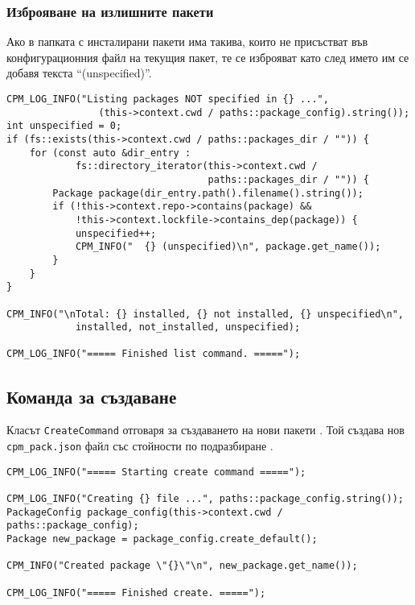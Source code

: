 \subsubsection{Изброяване на излишните пакети}

Ако в папката с инсталирани пакети има такива, които не присъстват във
конфигурационния файл на текущия пакет, те се изброяват като след името им се
добавя текста ``(unspecified)''.

\begin{lstlisting}[style=cpp,
				   caption=Команда за изброяване,
				   label={lst:list-unspecified}]
CPM_LOG_INFO("Listing packages NOT specified in {} ...",
				(this->context.cwd / paths::package_config).string());
int unspecified = 0;
if (fs::exists(this->context.cwd / paths::packages_dir / "")) {
	for (const auto &dir_entry :
			fs::directory_iterator(this->context.cwd /
								   paths::packages_dir / "")) {
		Package package(dir_entry.path().filename().string());
		if (!this->context.repo->contains(package) &&
			!this->context.lockfile->contains_dep(package)) {
			unspecified++;
			CPM_INFO("  {} (unspecified)\n", package.get_name());
		}
	}
}

CPM_INFO("\nTotal: {} installed, {} not installed, {} unspecified\n",
			installed, not_installed, unspecified);

CPM_LOG_INFO("===== Finished list command. =====");
\end{lstlisting}


\subsection{Команда за създаване}

Класът \texttt{CreateCommand} отговаря за създаването на нови пакети
. Той създава нов \texttt{cpm\_pack.json} файл със стойности
по подразбиране .

\begin{lstlisting}[style=cpp,
				   caption=Команда за създаване,
				   label={lst:create}]
CPM_LOG_INFO("===== Starting create command =====");

CPM_LOG_INFO("Creating {} file ...", paths::package_config.string());
PackageConfig package_config(this->context.cwd / paths::package_config);
Package new_package = package_config.create_default();

CPM_INFO("Created package \"{}\"\n", new_package.get_name());

CPM_LOG_INFO("===== Finished create. =====");
\end{lstlisting}

